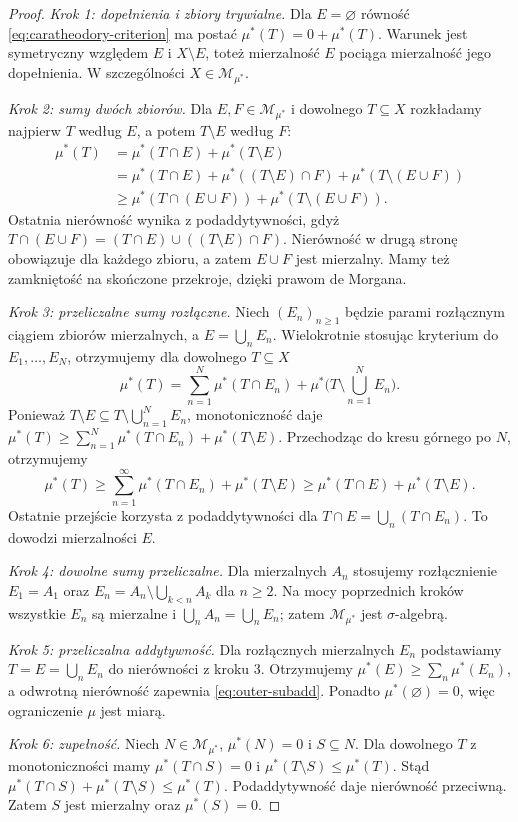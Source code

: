 \begin{proof}
\emph{Krok 1: dopełnienia i zbiory trywialne.}
Dla $E=\varnothing$ równość
\eqref{eq:caratheodory-criterion} ma postać
$\mu^*(T)=0+\mu^*(T)$. Warunek jest symetryczny względem
$E$ i $X\setminus E$, toteż mierzalność $E$ pociąga mierzalność
jego dopełnienia. W szczególności $X\in\mathcal M_{\mu^*}$.

\emph{Krok 2: sumy dwóch zbiorów.}
Dla $E,F\in\mathcal M_{\mu^*}$ i dowolnego $T\subseteq X$
rozkładamy najpierw $T$ według $E$, a potem $T\setminus E$
według $F$:
\begin{align*}
\mu^*(T)
&=\mu^*(T\cap E)+\mu^*(T\setminus E)\\
&=\mu^*(T\cap E)+\mu^*((T\setminus E)\cap F)
  +\mu^*(T\setminus(E\cup F))\\
&\ge\mu^*(T\cap(E\cup F))
  +\mu^*(T\setminus(E\cup F)).
\end{align*}
Ostatnia nierówność wynika z podaddytywności, gdyż
$T\cap(E\cup F)=(T\cap E)\cup((T\setminus E)\cap F)$.
Nierówność w drugą stronę obowiązuje dla każdego zbioru, a zatem
$E\cup F$ jest mierzalny. Mamy też zamkniętość na skończone
przekroje, dzięki prawom de Morgana.

\emph{Krok 3: przeliczalne sumy rozłączne.}
Niech $(E_n)_{n\ge1}$ będzie parami rozłącznym ciągiem
zbiorów mierzalnych, a $E=\bigcup_nE_n$.
Wielokrotnie stosując kryterium do $E_1,\ldots,E_N$,
otrzymujemy dla dowolnego $T\subseteq X$
\[
\mu^*(T)=\sum_{n=1}^N\mu^*(T\cap E_n)
+\mu^*\Big(T\setminus\bigcup_{n=1}^N E_n\Big).
\]
Ponieważ $T\setminus E\subseteq T\setminus\bigcup_{n=1}^N E_n$,
monotoniczność daje
$\mu^*(T)\ge\sum_{n=1}^N\mu^*(T\cap E_n)
+\mu^*(T\setminus E)$.
Przechodząc do kresu górnego po $N$, otrzymujemy
\[
\mu^*(T)\ge\sum_{n=1}^\infty\mu^*(T\cap E_n)
+\mu^*(T\setminus E)
\ge\mu^*(T\cap E)+\mu^*(T\setminus E).
\]
Ostatnie przejście korzysta z podaddytywności dla
$T\cap E=\bigcup_n(T\cap E_n)$. To dowodzi mierzalności $E$.

\emph{Krok 4: dowolne sumy przeliczalne.}
Dla mierzalnych $A_n$ stosujemy rozłącznienie
$E_1=A_1$ oraz $E_n=A_n\setminus\bigcup_{k<n}A_k$ dla $n\ge2$.
Na mocy poprzednich kroków wszystkie $E_n$ są mierzalne i
$\bigcup_n A_n=\bigcup_n E_n$; zatem
$\mathcal M_{\mu^*}$ jest $\sigma$-algebrą.

\emph{Krok 5: przeliczalna addytywność.}
Dla rozłącznych mierzalnych $E_n$ podstawiamy $T=E=\bigcup_nE_n$
do nierówności z kroku 3. Otrzymujemy
$\mu^*(E)\ge\sum_n\mu^*(E_n)$, a odwrotną nierówność zapewnia
\eqref{eq:outer-subadd}. Ponadto $\mu^*(\varnothing)=0$,
więc ograniczenie $\mu$ jest miarą.

\emph{Krok 6: zupełność.}
Niech $N\in\mathcal M_{\mu^*}$, $\mu^*(N)=0$ i $S\subseteq N$.
Dla dowolnego $T$ z monotoniczności mamy
$\mu^*(T\cap S)=0$ i
$\mu^*(T\setminus S)\le\mu^*(T)$.
Stąd
$\mu^*(T\cap S)+\mu^*(T\setminus S)\le\mu^*(T)$.
Podaddytywność daje nierówność przeciwną. Zatem $S$ jest
mierzalny oraz $\mu^*(S)=0$.
\end{proof}

